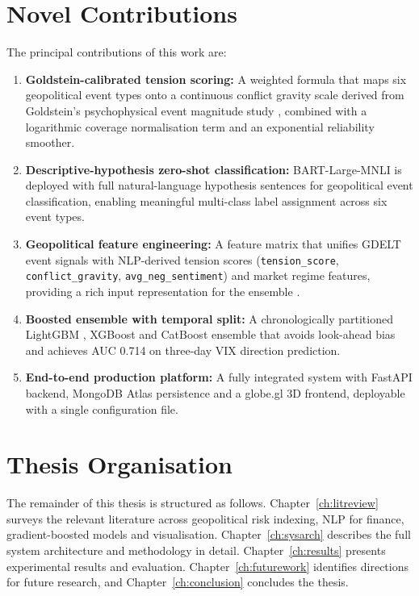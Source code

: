 \documentclass[12pt,a4paper]{report}
\begin{document}
\section{Novel Contributions}

The principal contributions of this work are:

\begin{enumerate}
  \item \textbf{Goldstein-calibrated tension scoring:} A weighted formula
        that maps six geopolitical event types onto a continuous conflict
        gravity scale derived from Goldstein's psychophysical event magnitude
        study \cite{goldstein1992}, combined with a logarithmic coverage
        normalisation term \cite{manela2017} and an exponential reliability
        smoother.
  \item \textbf{Descriptive-hypothesis zero-shot classification:}
        BART-Large-MNLI \cite{lewis2020} is deployed with full natural-language
        hypothesis sentences for geopolitical event classification, enabling
        meaningful multi-class label assignment across six event types.
  \item \textbf{Geopolitical feature engineering:} A feature matrix that
        unifies GDELT event signals with NLP-derived tension scores
        (\texttt{tension\_score}, \texttt{conflict\_gravity},
        \texttt{avg\_neg\_sentiment}) and market regime features, providing
        a rich input representation for the ensemble \cite{friedman2001}.
  \item \textbf{Boosted ensemble with temporal split:} A chronologically
        partitioned LightGBM \cite{ke2017}, XGBoost \cite{chen2016} and
        CatBoost \cite{prokhorenkova2018} ensemble that avoids look-ahead
        bias and achieves AUC 0.714 on three-day VIX direction prediction.
  \item \textbf{End-to-end production platform:} A fully integrated system
        with FastAPI backend, MongoDB Atlas persistence and a globe.gl 3D
        frontend, deployable with a single configuration file.
\end{enumerate}

\section{Thesis Organisation}

The remainder of this thesis is structured as follows.
Chapter~\ref{ch:litreview} surveys the relevant literature across geopolitical
risk indexing, NLP for finance, gradient-boosted models and visualisation.
Chapter~\ref{ch:sysarch} describes the full system architecture and methodology
in detail. Chapter~\ref{ch:results} presents experimental results and evaluation.
Chapter~\ref{ch:futurework} identifies directions for future research, and
Chapter~\ref{ch:conclusion} concludes the thesis.
\end{document}
